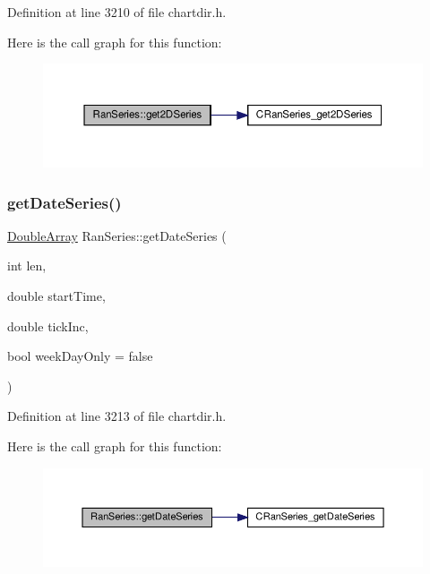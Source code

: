 Definition at line 3210 of file chartdir.\+h.

Here is the call graph for this function\+:
\nopagebreak
\begin{figure}[H]
\begin{center}
\leavevmode
\includegraphics[width=350pt]{class_ran_series_abfabe60593b246b272936f3e74a73673_cgraph}
\end{center}
\end{figure}
\mbox{\label{class_ran_series_a513311c8a995b7fd8885f89f90ea33d8}} 
\subsubsection{\texorpdfstring{get\+Date\+Series()}{getDateSeries()}}
{\footnotesize\ttfamily \hyperlink{class_double_array}{Double\+Array} Ran\+Series\+::get\+Date\+Series (\begin{DoxyParamCaption}\item[{int}]{len,  }\item[{double}]{start\+Time,  }\item[{double}]{tick\+Inc,  }\item[{bool}]{week\+Day\+Only = {\ttfamily false} }\end{DoxyParamCaption})\hspace{0.3cm}{\ttfamily [inline]}}



Definition at line 3213 of file chartdir.\+h.

Here is the call graph for this function\+:
\nopagebreak
\begin{figure}[H]
\begin{center}
\leavevmode
\includegraphics[width=350pt]{class_ran_series_a513311c8a995b7fd8885f89f90ea33d8_cgraph}
\end{center}
\end{figure}
\mbox{\label{class_ran_series_ac538aef12148303005ef6af6a882af88}} 
